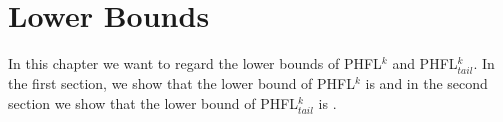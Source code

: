 
\chapter{Lower Bounds}\label{ch:lowerBounds}

In this chapter we want to regard the lower bounds of PHFL$^k$ and PHFL$^k_{tail}$. In the first section, we show that
the lower bound of PHFL$^k$ is  and in the second section we show that the lower bound of
PHFL$^k_{tail}$ is .




